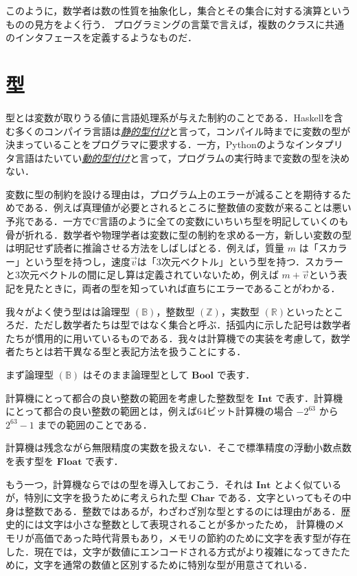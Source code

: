 \documentclass[a4paper,draft]{jsbook}
\newcommand{\programminglanguage}[1]{\textsf{#1}}
\newcommand{\clang}{\programminglanguage{C}}
\newcommand{\haskell}{\programminglanguage{Haskell}}
\newcommand{\python}{\programminglanguage{Python}}
\newcommand{\keyword}[1]{{\underline{\emph{#1}}}}
\newcommand{\mSpecialSet}[1]{\mathbb{#1}} %
\newcommand{\mRSet}{\mSpecialSet{R}}
\newcommand{\mZSet}{\mSpecialSet{Z}}
\newcommand{\mBSet}{\mSpecialSet{B}}
\newcommand{\mType}[1]{\mathbf{#1}}
\newcommand{\mBoolType}{\mType{Bool}}
\newcommand{\mCharType}{\mType{Char}}
\newcommand{\mIntType}{\mType{Int}}
\newcommand{\mFloatType}{\mType{Float}}
\begin{document}
このように，数学者は数の性質を抽象化し，集合とその集合に対する演算というものの見方をよく行う．
プログラミングの言葉で言えば，複数のクラスに共通のインタフェースを定義するようなものだ．

\section{型}

型とは変数が取りうる値に言語処理系が与えた制約のことである．\haskell を含む多くのコンパイラ言語は\keyword{静的型付け}と言って，コンパイル時までに変数の型が決まっていることをプログラマに要求する．一方，\python のようなインタプリタ言語はたいてい\keyword{動的型付け}と言って，プログラムの実行時まで変数の型を決めない．

変数に型の制約を設ける理由は，プログラム上のエラーが減ることを期待するためである．例えば真理値が必要とされるところに整数値の変数が来ることは悪い予兆である．一方で\clang 言語のように全ての変数にいちいち型を明記していくのも骨が折れる．数学者や物理学者は変数に型の制約を求める一方，新しい変数の型は明記せず読者に推論させる方法をしばしばとる．例えば，質量 $m$ は「スカラー」という型を持つし，速度$\vec{v}$は「3次元ベクトル」という型を持つ．スカラーと3次元ベクトルの間に足し算は定義されていないため，例えば $m+\vec{v}$という表記を見たときに，両者の型を知っていれば直ちにエラーであることがわかる．

我々がよく使う型はは論理型 $(\mBSet)$，整数型 $(\mZSet)$，実数型 $(\mRSet)$といったところだ．ただし数学者たちは型ではなく集合と呼ぶ．括弧内に示した記号は数学者たちが慣用的に用いているものである．我々は計算機での実装を考慮して，数学者たちとは若干異なる型と表記方法を扱うことにする．

まず論理型 $(\mBSet)$ はそのまま論理型として $\mBoolType$ で表す．

計算機にとって都合の良い整数の範囲を考慮した整数型を $\mIntType$ で表す．計算機にとって都合の良い整数の範囲とは，例えば64ビット計算機の場合 $-2^{63}$ から $2^{63}-1$ までの範囲のことである．

計算機は残念ながら無限精度の実数を扱えない．そこで標準精度の浮動小数点数を表す型を $\mFloatType$ で表す．

もう一つ，計算機ならではの型を導入しておこう．それは $\mIntType$ とよく似ているが，特別に文字を扱うために考えられた型 $\mCharType$ である．文字といってもその中身は整数である．整数ではあるが，わざわざ別な型とするのには理由がある．歴史的には文字は小さな整数として表現されることが多かったため，
計算機のメモリが高価であった時代背景もあり，メモリの節約のために文字を表す型が存在した．現在では，文字が数値にエンコードされる方式がより複雑になってきたために，文字を通常の数値と区別するために特別な型が用意さてれいる．
\end{document}
